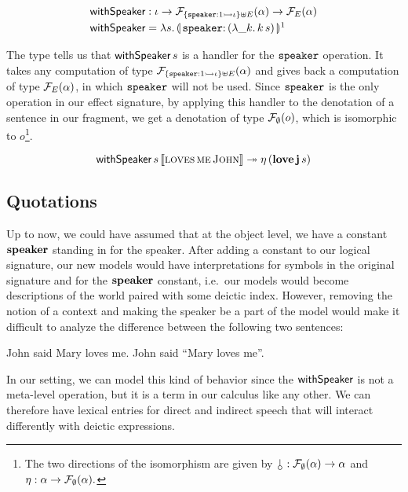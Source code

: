 \begin{align*}
  \withSpeaker &: \iota \to \FF_{\{\typedop{speaker}{1}{\iota}\} \uplus E}(\alpha) \to \FF_E(\alpha) \\
  \withSpeaker &= \lam{s}{\banana{\onto{\op{speaker}}{(\lam{\_ k}{\ap{k}{s}})}}}\footnotemark
\end{align*}


The type tells us that $\textsf{withSpeaker}\,s$ is a handler for the
$\mathtt{speaker}$ operation. It takes any computation of type
$\mathcal{F}_{\{\mathtt{speaker} : 1 \rightarrowtail \iota\} \uplus E}(\alpha)$ and gives back a
computation of type $\mathcal{F}_E(\alpha)$, in which $\mathtt{speaker}$ will not be
used. Since $\mathtt{speaker}$ is the only operation in our effect signature,
by applying this handler to the denotation of a sentence in our fragment,
we get a denotation of type $\mathcal{F}_\emptyset(o)$, which is isomorphic to
$o$\footnote{The two directions of the isomorphism are given by
  $\cherry : \FF_\emptyset(\alpha) \to \alpha$ and
  $\eta : \alpha \to \mathcal{F}_\emptyset(\alpha).$}.

$$
  \textsf{withSpeaker}\,s\,\llbracket \textsc{loves}\,\textsc{me}\,\textsc{John} \rrbracket \twoheadrightarrow
  \eta\,(\textbf{love}\,\textbf{j}\,s)
$$


\subsection{Quotations}

Up to now, we could have assumed that at the object level, we have a
constant $\textbf{speaker}$ standing in for the speaker. After adding a
constant to our logical signature, our new models would have
interpretations for symbols in the original signature and for the
$\textbf{speaker}$ constant, i.e.\ our models would become descriptions of the
world paired with some deictic index. However, removing the notion of a
context and making the speaker be a part of the model would make it
difficult to analyze the difference between the following two sentences:

\begin{exe}
  \ex John said Mary loves me. \label{ex:indirect-speech}
  \ex John said ``Mary loves me''. \label{ex:direct-speech}
\end{exe}

In our setting, we can model this kind of behavior since the $\textsf{withSpeaker}$
is not a meta-level operation, but it is a term in our calculus like any
other. We can therefore have lexical entries for direct and indirect speech
that will interact differently with deictic expressions.

